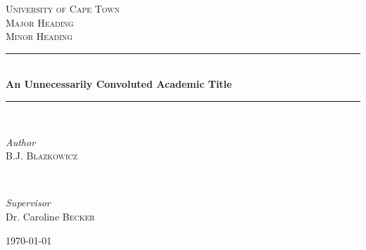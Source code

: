 \documentclass[11pt]{article}
\begin{document}
\begin{titlepage}
	\newcommand{\HRule}{\rule{\linewidth}{0.5mm}}
	
	\center
	\textsc{\LARGE University of Cape Town}\\[1.5cm]
	\textsc{\Large Major Heading}\\[0.5cm]
	\textsc{\large Minor Heading}\\[0.5cm]

	\HRule\\[0.4cm]
	{\huge\bfseries An Unnecessarily Convoluted Academic Title}\\[0.4cm]
	\HRule\\[1.5cm]

	\begin{minipage}{0.4\textwidth}
		\begin{flushleft}
			\large
			\textit{Author}\\
			B.J. \textsc{Blazkowicz} %
		\end{flushleft}
	\end{minipage}
	~
	\begin{minipage}{0.4\textwidth}
		\begin{flushright}
			\large
			\textit{Supervisor}\\
			Dr. Caroline \textsc{Becker} %
		\end{flushright}
	\end{minipage}
	
	\vfill\vfill\vfill %
	
	{\large\today} %
	
	
	 
	
	\vfill %
	
\end{titlepage}

\end{document}
